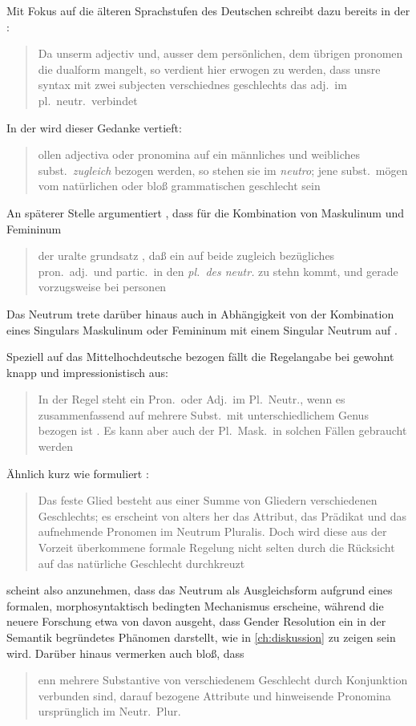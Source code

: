 Mit Fokus auf die älteren Sprachstufen des Deutschen schreibt dazu bereits
\citeauthor{grimm1848} in der :
\blockcquote[978]{grimm1848}{Da unserm adjectiv und, ausser dem
persönlichen, dem übrigen pronomen die dualform mangelt, so verdient hier
erwogen zu werden, dass unsre syntax mit zwei subjecten verschiednes
geschlechts das adj.\ im pl.~neutr.\ verbindet}. In der  wird dieser Gedanke vertieft:
\blockcquote[311--312]{grimm1890}{ollen adjectiva oder pronomina
auf ein männliches und weibliches subst.\ \emph{zugleich} bezogen werden, so
stehen sie im \emph{neutro}; jene subst.\ mögen vom natürlichen oder bloß
grammatischen geschlecht sein}. An späterer Stelle argumentiert
\citeauthor{grimm1898}, dass für die Kombination von Maskulinum und Femininum
\blockcquote[329]{grimm1898}{der uralte grundsatz , daß ein auf
beide zugleich bezügliches pron.\ adj.\ und partic.\ in den \emph{pl.\ des
neutr.} zu stehn kommt, und gerade vorzugsweise bei personen}. Das Neutrum
trete darüber hinaus auch in Abhängigkeit von der Kombination eines Singulars
Maskulinum oder Femininum mit einem Singular Neutrum auf
\autocite[331]{grimm1898}.

Speziell auf das Mittelhochdeutsche bezogen fällt die Regelangabe bei
\citeauthor{paul2007} gewohnt knapp und impressionistisch aus:
\blockcquote[384]{paul2007}{In der Regel steht ein Pron.\ oder Adj.\ im
Pl.~Neutr., wenn es zusammenfassend auf mehrere Subst.\ mit unterschiedlichem
Genus bezogen ist \textelp{}. Es kann aber auch der Pl.~Mask.\ in solchen
Fällen gebraucht werden}. Ähnlich kurz wie \citet{paul2007} formuliert
\citet[39]{behaghel1928}: \blockquote{Das feste Glied besteht aus einer Summe
von Gliedern verschiedenen Geschlechts; es erscheint von alters her das
Attribut, das Prädikat und das aufnehmende Pronomen im Neutrum Pluralis.
\textelp{} Doch wird diese aus der Vorzeit überkommene formale Regelung nicht
selten durch die Rücksicht auf das natürliche Geschlecht durchkreuzt}.

\citet{behaghel1928} scheint also anzunehmen, dass das Neutrum als
Ausgleichsform aufgrund eines formalen, morphosyntaktisch bedingten Mechanismus
erscheine, während die neuere Forschung etwa von
\citet{wechslerzlatic2003,wechsler2009} davon ausgeht, dass Gender Resolution
ein in der Semantik begründetes Phänomen darstellt, wie in \cref{ch:diskussion}
zu zeigen sein wird. Darüber hinaus vermerken auch \citet[188]{dal2014} bloß,
dass \blockquote{enn mehrere Substantive von verschiedenem
Geschlecht durch Konjunktion verbunden sind, \textelp{} darauf bezogene
Attribute und hinweisende Pronomina ursprünglich im Neutr.\ Plur.\
}.

